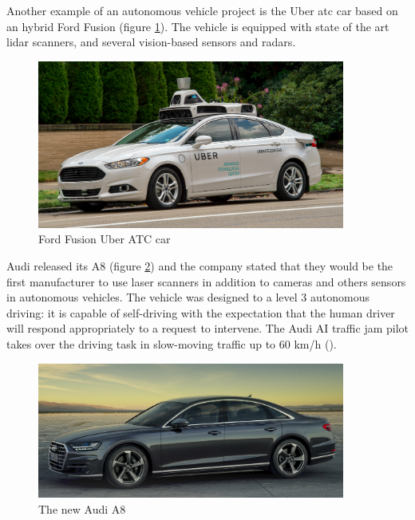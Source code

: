 Another example of an autonomous vehicle project is the Uber \gls{atc} car based on an hybrid Ford Fusion (figure \ref{fig:uber}). The vehicle is equipped with state of the art \gls{lidar} scanners, and several vision-based sensors and radars.

\begin{figure}[htp]
	
	\centering
	\includegraphics[width=0.9\textwidth]{capstate/imgs/uber}
	
	\caption{Ford Fusion Uber ATC car}
	\label{fig:uber}
	
\end{figure}

Audi released its A8 (figure \ref{fig:audi}) and the company stated that they would be the first manufacturer to use laser scanners in addition to cameras and others sensors in autonomous vehicles. The vehicle was designed to a level 3 autonomous driving: it is capable of self-driving with the expectation that the human driver will respond appropriately to a request to intervene. The Audi AI traffic jam pilot takes over the driving task in slow-moving traffic up to 60 km/h (\cite{AudiMediaCenter}).

\begin{figure}[htp]
	
	\centering
	\includegraphics[width=0.9\textwidth]{capstate/imgs/audi}
	
	\caption{The new Audi A8}
	\label{fig:audi}
	
\end{figure}

